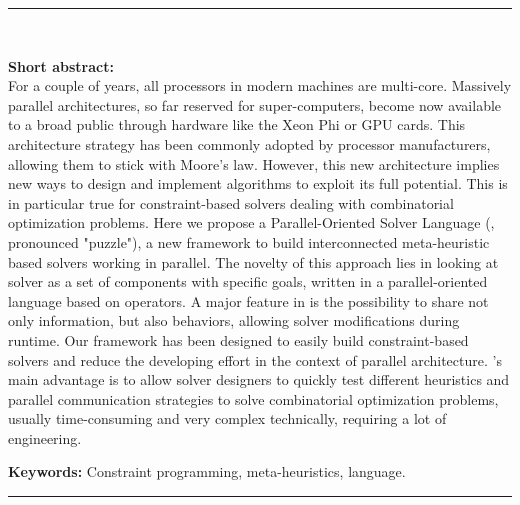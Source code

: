 \cleardoublepage
\begin{vcentrepage}
\noindent\rule[2pt]{\textwidth}{0.8pt}\\
\begin{center}
{\Large\textbf{\titre}}
\end{center}
{\large\textbf{Short abstract:}\\}
For a couple of years, all processors in modern machines are multi-core. Massively parallel architectures, so far reserved for super-computers, become now available to a broad public through hardware like the Xeon Phi or GPU cards. This architecture strategy has been commonly adopted by processor manufacturers, allowing them to stick with Moore's law. However, this new architecture implies new ways to design and implement algorithms to exploit its full potential. This is in particular true for constraint-based solvers dealing with combinatorial optimization problems. Here we propose a Parallel-Oriented Solver Language (\posl, pronounced "puzzle"), a new framework to build interconnected meta-heuristic based solvers working in parallel. The novelty of this approach lies in looking at solver as a set of components with specific goals, written in a parallel-oriented language based on operators. A major feature in \posl{} is the possibility to share not only information, but also behaviors, allowing solver modifications during runtime. Our framework has been designed to easily build constraint-based solvers and reduce the developing effort in the context of parallel architecture. \posl's main advantage is to allow solver designers to quickly test different heuristics and parallel communication strategies to solve combinatorial optimization problems, usually time-consuming and very complex technically, requiring a lot of engineering.

{\large\textbf{Keywords:}}
Constraint programming, meta-heuristics, language.

\noindent\rule[2pt]{\textwidth}{0.8pt}
\end{vcentrepage}

